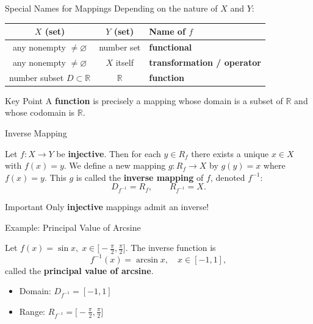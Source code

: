 \documentclass[aspectratio=169,10pt]{beamer}
\begin{document}
\begin{frame}{Special Names for Mappings}
  Depending on the nature of $X$ and $Y$:
  \pause
  \begin{center}
    \renewcommand{\arraystretch}{1.4}
    \begin{tabular}{ccl}
      $X$ (set) & $Y$ (set) & Name of $f$ \\
      \hline
      any nonempty $\neq\varnothing$ & number set & \textbf{functional} \\
      any nonempty $\neq\varnothing$ & $X$ itself & \textbf{transformation / operator} \\
      number subset $D\subset\mathbb{R}$ & $\mathbb{R}$ & \textbf{function} \\
    \end{tabular}
  \end{center}
  \pause
  \vspace{6pt}
  \begin{block}{Key Point}
    A \textbf{function} is precisely a mapping whose domain is a subset of $\mathbb{R}$ and whose codomain is $\mathbb{R}$.
  \end{block}
\end{frame}

\begin{frame}{Inverse Mapping}
  \begin{definition}
    Let $f\colon X\to Y$ be \textbf{injective}. Then for each $y\in R_f$
    there exists a unique $x\in X$ with $f(x)=y$.
    \pause
    We define a new mapping $g\colon R_f\to X$ by $g(y)=x$ where $f(x)=y$.
    This $g$ is called the \textbf{inverse mapping} of $f$, denoted $f^{-1}$:
    \[
      D_{f^{-1}} = R_f,\qquad R_{f^{-1}} = X.
    \]
  \end{definition}
  \pause
  \begin{alertblock}{Important}
    Only \textbf{injective} mappings admit an inverse!
  \end{alertblock}
\end{frame}

\begin{frame}{Example: Principal Value of Arcsine}
  \begin{example}
    Let $f(x)=\sin x,\; x\in\bigl[-\frac{\pi}{2},\frac{\pi}{2}\bigr]$.
    \pause
    The inverse function is
    \[
      f^{-1}(x) = \arcsin x,\quad x\in[-1,1],
    \]
    called the \textbf{principal value of arcsine}.
    \pause
    \begin{itemize}
      \item Domain: $D_{f^{-1}}=[-1,1]$
      \item Range: $R_{f^{-1}}=\bigl[-\frac{\pi}{2},\frac{\pi}{2}\bigr]$
    \end{itemize}
  \end{example}
\end{frame}
\end{document}
